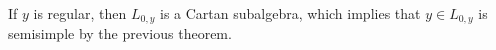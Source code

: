 If $y$ is regular, then $L_{0, y}$ is a Cartan subalgebra, which implies that
$y \in L_{0, y}$ is semisimple by the previous theorem.
